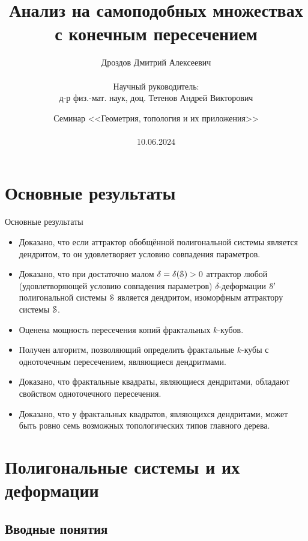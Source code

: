 \documentclass[aspectratio=1610, 10pt, notheorems]{beamer}
\title[ ]
    {Анализ на самоподобных множествах с конечным пересечением}
\author[ ]
    {Дроздов Дмитрий Алексеевич\\ \; \\
    Научный руководитель:\\ 
    д-р физ.-мат. наук, доц.
    Тетенов Андрей Викторович}
\institute[ИМ СО РАН]{Институт математики имени С. Л. Соболева СО РАН}
\date[10.06.2024]
    {Семинар <<Геометрия, топология и их приложения>>\\ \; \\
    10.06.2024}
\begin{document}
\begin{frame}{}
    \titlepage
\end{frame}


\section{Основные результаты} 

\begin{frame}{Основные результаты}

{\large
\begin{itemize}
\item Доказано, что если аттрактор обобщённой полигональной системы является дендритом, то он удовлетворяет условию совпадения параметров.
\item Доказано, что при достаточно малом $\delta=\delta({\EuScript S})>0$ аттрактор любой (удовлетворяющей условию совпадения параметров) $\delta$-деформации ${\EuScript S}'$  полигональной системы ${\EuScript S}$ является дендритом, изоморфным аттрактору системы ${\EuScript S}$.
\item Оценена мощность пересечения копий фрактальных $k$-кубов.
\item Получен алгоритм, позволяющий определить фрактальные $k$-кубы с одноточечным пересечением, являющиеся дендритмами.
\item Доказано, что фрактальные квадраты, являющиеся дендритами, обладают свойством одноточечного пересечения.
\item Доказано, что у фрактальных квадратов, являющихся дендритами, может быть ровно семь возможных топологических типов главного дерева.
\end{itemize}}
\end{frame}

\section{Полигональные системы и их деформации} %


\subsection{Вводные понятия} %
\end{document}
